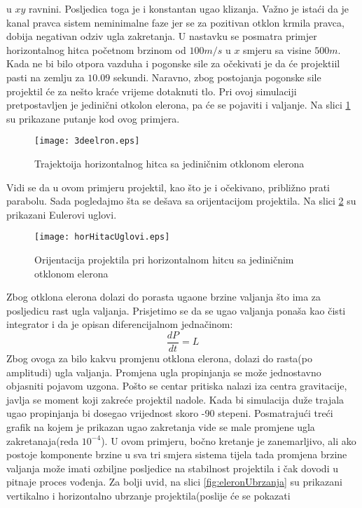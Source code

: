 u $xy$ ravnini. Posljedica toga je i konstantan ugao klizanja. Važno je istaći da je kanal pravca 
sistem neminimalne faze jer se za pozitivan otklon krmila pravca, dobija negativan odziv ugla zakretanja. 
U nastavku se posmatra primjer horizontalnog hitca početnom brzinom od $100m/s$ u $x$ smjeru
sa visine $500m$. Kada ne bi bilo otpora vazduha i pogonske sile za očekivati je da će projektiil pasti na zemlju 
za $10.09$ sekundi. Naravno, zbog postojanja pogonske sile projektil će za nešto kraće vrijeme 
dotaknuti tlo. Pri ovoj simulaciji pretpostavljen je jedinični otkolon elerona, pa će se pojaviti i valjanje. 
Na slici \ref{fig:eleronPutanja} su prikazane putanje kod ovog primjera. 
\begin{figure}[!ht]
    \centering
    \texttt{[image: 3deelron.eps]}
    \caption{Trajektoija horizontalnog hitca sa jediničnim otklonom elerona}
    \label{fig:eleronPutanja}
\end{figure}
Vidi se da u ovom primjeru projektil, kao što je i očekivano, približno prati parabolu. 
Sada pogledajmo šta se dešava sa orijentacijom projektila. Na slici \ref{fig:orijentacijaEleron}
su prikazani Eulerovi uglovi. 
\begin{figure}[!ht]
    \centering
    \texttt{[image: horHitacUglovi.eps]}
    \caption{Orijentacija projektila pri horizontalnom hitcu sa jediničnim otklonom elerona}
    \label{fig:orijentacijaEleron}
\end{figure}
Zbog otklona elerona dolazi do porasta ugaone brzine valjanja što ima za posljedicu 
rast ugla valjanja. Prisjetimo se da se ugao valjanja ponaša kao čisti integrator i da je 
opisan diferencijalnom jednačinom:
\begin{equation*}
    \frac{dP}{dt} = L
\end{equation*}
Zbog ovoga za bilo kakvu promjenu otklona elerona, dolazi do rasta(po amplitudi) ugla valjanja. 
Promjena ugla propinjanja se može jednostavno objasniti pojavom uzgona. Pošto se centar pritiska nalazi 
iza centra gravitacije, javlja se moment koji zakreće projektil nadole. Kada bi simulacija duže trajala 
ugao propinjanja bi dosegao vrijednost skoro -90 stepeni. Posmatrajući treći grafik na kojem 
je prikazan ugao zakretanja vide se male promjene ugla zakretanaja(reda $10^{-4}$). U ovom primjeru,
bočno kretanje je zanemarljivo, ali ako postoje komponente brzine u sva tri smjera sistema tijela tada 
promjena brzine valjanja može imati ozbiljne posljedice na stabilnost projektila i čak dovodi u pitnaje proces vođenja.
Za bolji uvid, na slici \ref{fig:eleronUbrzanja} su prikazani vertikalno i horizontalno ubrzanje projektila(poslije će se pokazati 
